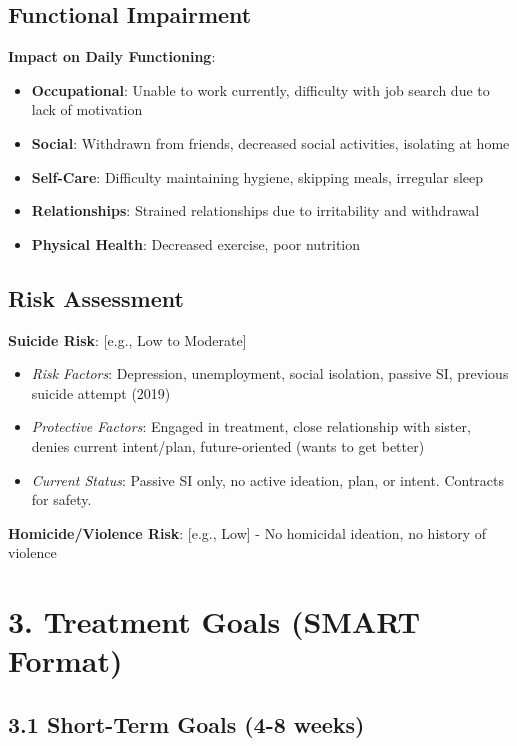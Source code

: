 \documentclass[11pt,letterpaper]{article}
\begin{document}
\subsection*{Functional Impairment}

\textbf{Impact on Daily Functioning}:
\begin{itemize}[leftmargin=*]
    \item \textbf{Occupational}: Unable to work currently, difficulty with job search due to lack of motivation
    \item \textbf{Social}: Withdrawn from friends, decreased social activities, isolating at home
    \item \textbf{Self-Care}: Difficulty maintaining hygiene, skipping meals, irregular sleep
    \item \textbf{Relationships}: Strained relationships due to irritability and withdrawal
    \item \textbf{Physical Health}: Decreased exercise, poor nutrition
\end{itemize}

\subsection*{Risk Assessment}

\textbf{Suicide Risk}: [e.g., Low to Moderate]
\begin{itemize}[leftmargin=*]
    \item \textit{Risk Factors}: Depression, unemployment, social isolation, passive SI, previous suicide attempt (2019)
    \item \textit{Protective Factors}: Engaged in treatment, close relationship with sister, denies current intent/plan, future-oriented (wants to get better)
    \item \textit{Current Status}: Passive SI only, no active ideation, plan, or intent. Contracts for safety.
\end{itemize}

\textbf{Homicide/Violence Risk}: [e.g., Low] - No homicidal ideation, no history of violence

\section*{3. Treatment Goals (SMART Format)}

\subsection*{3.1 Short-Term Goals (4-8 weeks)}
\end{document}
